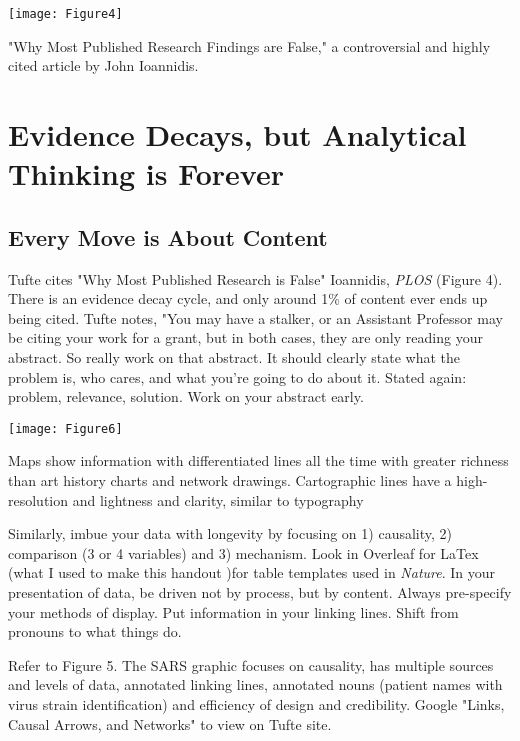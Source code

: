 \documentclass{tufte-handout}
\begin{document}
\begin{marginfigure}
\texttt{[image: Figure4]}
\caption{"Why Most Published Research Findings are False," a controversial and highly cited article by John Ioannidis.}
\end{marginfigure}




\section{Evidence Decays, but Analytical Thinking is Forever}


\subsection{Every Move is About Content}



 Tufte cites "Why Most Published Research is False" Ioannidis, \textit{PLOS} (Figure 4).  There is an evidence decay cycle, and only around 1\% of content ever ends up being cited. Tufte notes, "You may have a stalker, or an Assistant Professor may be citing your work for a grant, but in both cases, they are only reading your abstract.  So really work on that abstract.  It should clearly state what the problem is, who cares, and what you're going to do about it.  Stated again: problem, relevance, solution.  Work on your abstract early.  


\begin{marginfigure}
\texttt{[image: Figure6]}
\caption{Maps show information with differentiated lines all the time with greater richness than art history charts and network drawings.  Cartographic lines have a high-resolution and lightness and clarity, similar to typography}
\end{marginfigure}


Similarly, imbue your data with longevity by focusing on 1) causality, 2) comparison (3 or 4 variables) and 3) mechanism.  Look in Overleaf for LaTex (what I used to make this handout )for table templates used in \textit{Nature}.  In your presentation of data, be driven not by process, but by content.  Always pre-specify your methods of display.  Put information in your linking lines. Shift from pronouns to what things do. 



Refer to Figure 5.  The SARS graphic focuses on causality, has multiple sources and levels of data, annotated linking lines, annotated nouns (patient names with virus strain identification) and efficiency of design and credibility.  Google "Links, Causal Arrows, and Networks" to view on Tufte site.
\end{document}
